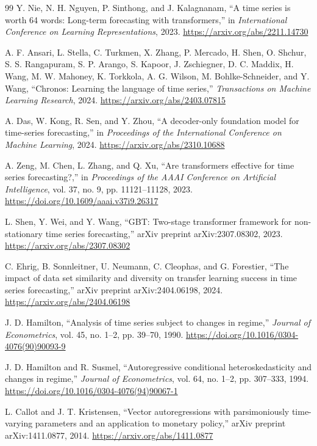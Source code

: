 \documentclass[review,number,sort&compress]{elsarticle}
\begin{document}
\begin{thebibliography}{99}
Y. Nie, N. H. Nguyen, P. Sinthong, and J. Kalagnanam, ``A time series is worth 64 words: Long-term forecasting with transformers,'' in \emph{International Conference on Learning Representations}, 2023. \url{https://arxiv.org/abs/2211.14730}

A. F. Ansari, L. Stella, C. Turkmen, X. Zhang, P. Mercado, H. Shen, O. Shchur, S. S. Rangapuram, S. P. Arango, S. Kapoor, J. Zschiegner, D. C. Maddix, H. Wang, M. W. Mahoney, K. Torkkola, A. G. Wilson, M. Bohlke-Schneider, and Y. Wang, ``Chronos: Learning the language of time series,'' \emph{Transactions on Machine Learning Research}, 2024. \url{https://arxiv.org/abs/2403.07815}

A. Das, W. Kong, R. Sen, and Y. Zhou, ``A decoder-only foundation model for time-series forecasting,'' in \emph{Proceedings of the International Conference on Machine Learning}, 2024. \url{https://arxiv.org/abs/2310.10688}

A. Zeng, M. Chen, L. Zhang, and Q. Xu, ``Are transformers effective for time series forecasting?,'' in \emph{Proceedings of the AAAI Conference on Artificial Intelligence}, vol. 37, no. 9, pp. 11121--11128, 2023. \url{https://doi.org/10.1609/aaai.v37i9.26317}

L. Shen, Y. Wei, and Y. Wang, ``GBT: Two-stage transformer framework for non-stationary time series forecasting,'' arXiv preprint arXiv:2307.08302, 2023. \url{https://arxiv.org/abs/2307.08302}

C. Ehrig, B. Sonnleitner, U. Neumann, C. Cleophas, and G. Forestier, ``The impact of data set similarity and diversity on transfer learning success in time series forecasting,'' arXiv preprint arXiv:2404.06198, 2024. \url{https://arxiv.org/abs/2404.06198}

J. D. Hamilton, ``Analysis of time series subject to changes in regime,'' \emph{Journal of Econometrics}, vol. 45, no. 1--2, pp. 39--70, 1990. \url{https://doi.org/10.1016/0304-4076(90)90093-9}

J. D. Hamilton and R. Susmel, ``Autoregressive conditional heteroskedasticity and changes in regime,'' \emph{Journal of Econometrics}, vol. 64, no. 1--2, pp. 307--333, 1994. \url{https://doi.org/10.1016/0304-4076(94)90067-1}

L. Callot and J. T. Kristensen, ``Vector autoregressions with parsimoniously time-varying parameters and an application to monetary policy,'' arXiv preprint arXiv:1411.0877, 2014. \url{https://arxiv.org/abs/1411.0877}


\end{thebibliography}
\end{document}
